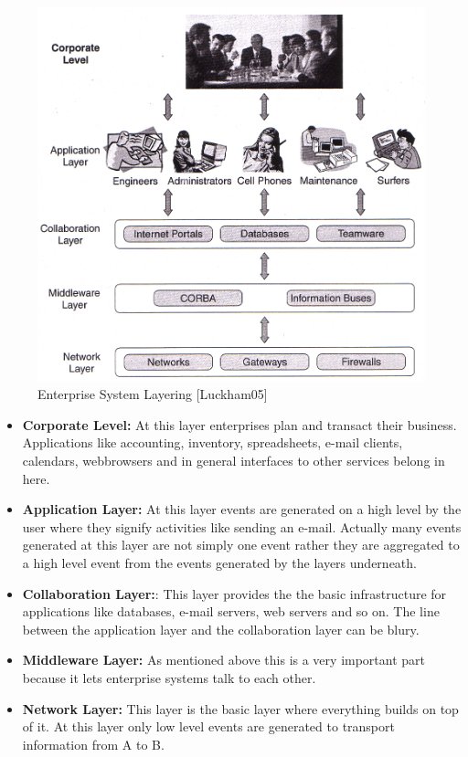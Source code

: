 \documentclass[a4paper,titlepage,11pt,DIV10,BCOR0.5cm,headinclude]{article}
\begin{document}
\\\\
\begin{figure} [h]                        
	\centering                                           
	\includegraphics[width=1\textwidth]{pics/corporateLayer.jpg}
	\caption{Enterprise System Layering [Luckham05]}             
	\label{fig:EnterpriseSystemLayer}
\end{figure}  
\begin{itemize}
	\item \textbf{Corporate Level:} At this layer enterprises plan and transact their business. Applications like accounting, inventory, spreadsheets, e-mail clients, calendars, webbrowsers and in general interfaces to other services belong in here.
	\item \textbf{Application Layer:} At this layer events are generated on a high level by the user where they signify activities like sending an e-mail. Actually many events generated at this layer are not simply one event rather they are aggregated to a high level event from the events generated by the layers underneath.
	\item \textbf{Collaboration Layer:}: This layer provides the the basic infrastructure for applications like databases, e-mail servers, web servers and so on. The line between the application layer and the collaboration layer can be blury.
	\item \textbf{Middleware Layer:} As mentioned above this is a very important part because it lets enterprise systems talk to each other.
	\item \textbf{Network Layer:} This layer is the basic layer where everything builds on top of it. At this layer only low level events are generated to transport information from A to B.
\end{itemize}
\end{document}
